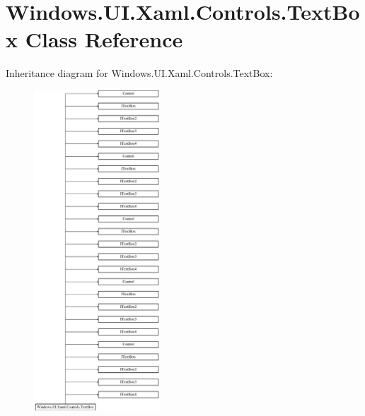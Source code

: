 \hypertarget{class_windows_1_1_u_i_1_1_xaml_1_1_controls_1_1_text_box}{}\section{Windows.\+U\+I.\+Xaml.\+Controls.\+Text\+Box Class Reference}
\label{class_windows_1_1_u_i_1_1_xaml_1_1_controls_1_1_text_box}
Inheritance diagram for Windows.\+U\+I.\+Xaml.\+Controls.\+Text\+Box\+:\begin{figure}[H]
\begin{center}
\leavevmode
\includegraphics[height=12.000000cm]{class_windows_1_1_u_i_1_1_xaml_1_1_controls_1_1_text_box}
\end{center}
\end{figure}
